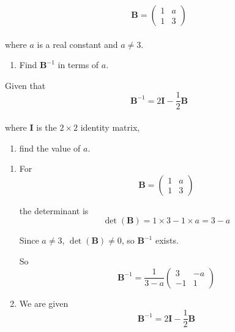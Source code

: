 \documentclass[leqno]{article}
\begin{document}
\djsFrontMatter
\begin{enumerate}[
  label=\textbf{\arabic*.},
  leftmargin=*,
  topsep=0pt,
  partopsep=0pt,
  parsep=0pt
]

\questionitem

\[
\mathbf{B} = \begin{pmatrix} 1 & a \\ 1 & 3 \end{pmatrix}
\] \\
where $a$ is a real constant and $a \neq 3$. \\

\begin{enumerate}[label=\textbf{(\alph*)}]
  \item Find $\mathbf{B}^{-1}$ in terms of $a$.  \\
\end{enumerate}

Given that
\[
\mathbf{B}^{-1} = 2\mathbf{I} - \frac{1}{2}\mathbf{B}
\] \\
where $\mathbf{I}$ is the $2 \times 2$ identity matrix, \\

\begin{enumerate}[label=\textbf{(\alph*)}, resume]
  \item find the value of $a$.  \\
\end{enumerate}

\vspace*{10pt}

\begin{djsSolution}
\begin{enumerate}[label=\textbf{(\alph*)}]
  \item For
\[
\mathbf{B}=\begin{pmatrix}1&a\\1&3\end{pmatrix}
\]

the determinant is
\[
\det(\mathbf{B})=1\times 3-1\times a=3-a
\]

Since $a\neq 3$, $\det(\mathbf{B})\neq 0$, so $\mathbf{B}^{-1}$ exists.

So
\[
\mathbf{B}^{-1}
=\frac{1}{3-a}\begin{pmatrix}3&-a\\-1&1\end{pmatrix}
\]

  \item We are given
\[
\mathbf{B}^{-1}=2\mathbf{I}-\frac12 \mathbf{B}
\]


\end{enumerate}
\end{djsSolution}
\end{enumerate}
\end{document}
